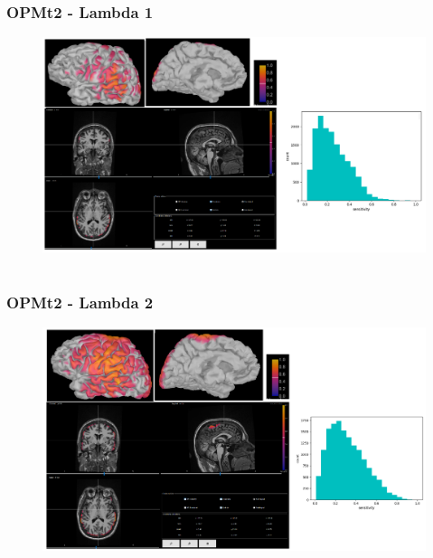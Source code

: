 \documentclass{beamer}
\numberwithin{figure}{section}
\numberwithin{equation}{section}
\begin{document}
\section{}
\begin{frame}
 \frametitle{OPMt2 - Lambda 1}
	\begin{figure}[p]
  		\centering
  		\includegraphics[width=1\linewidth]{pictures/opmt200}
  		\label{fig:approaches_RDF}
 	\end{figure}

  
\end{frame}

\section{}
\begin{frame}
 \frametitle{OPMt2 - Lambda 2}
	\begin{figure}[p]
  		\centering
  		\includegraphics[width=1\linewidth]{pictures/opmt211}
  		\label{fig:approaches_RDF}
 	\end{figure}

  
\end{frame}
\end{document}
